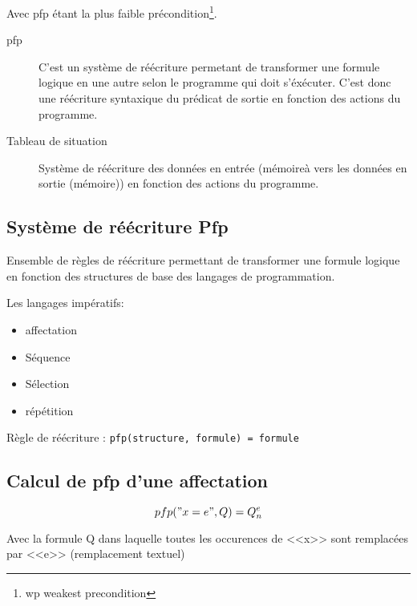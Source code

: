 	Avec pfp étant la plus faible précondition\footnote{wp weakest precondition}.
	\begin{description}
		\item[pfp]	C'est un système de réécriture permetant de transformer une formule logique en une autre selon le programme qui doit s'éxécuter.
			C'est donc une réécriture syntaxique du prédicat de sortie en fonction des actions du programme.  \item[Tableau de situation] Système de réécriture des données en entrée (mémoireà vers les données en sortie (mémoire)) en fonction des actions du programme.  \end{description}
	\subsection{Système de réécriture Pfp}
		Ensemble de règles de réécriture permettant de transformer une formule logique en fonction des structures de base des langages de programmation.

		Les langages impératifs:
			\begin{itemize}
				\item affectation
				\item Séquence
				\item Sélection
				\item répétition
			\end{itemize}

		Règle de réécriture : \texttt{pfp(structure, formule) = formule}

	\subsection{Calcul de pfp d'une affectation}
	$$pfp("x=e", Q) = Q^e_n$$

	Avec la formule Q dans laquelle toutes les occurences de <<x>> sont remplacées par <<e>> (remplacement textuel)

